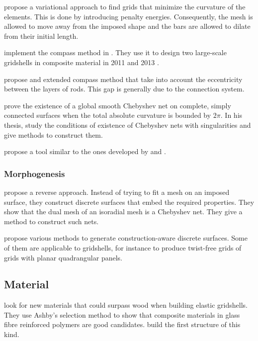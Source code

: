  propose a variational approach to find grids that minimize the curvature of the elements. This is done by introducing penalty energies. Consequently, the mesh is allowed to move away from the imposed shape and the bars are allowed to dilate from their initial length.

 implement the compass method in \grasshopper{}. They use it to design two large-scale gridshells in composite material in 2011 \cite{Baverel2012} and 2013 \Cite{DuPeloux2016}.

 propose and extended compass method that take into account the eccentricity between the layers of rods. This gap is generally due to the connection system.

 prove the existence of a global smooth Chebyshev net on complete, simply connected surfaces when the total absolute curvature is bounded by $2\pi$. In his thesis,  study the conditions of existence of Chebyshev nets with singularities and give methods to construct them.

 propose a tool similar to the ones developed by  and .

\subsubsection{Morphogenesis}

 propose a reverse approach. Instead of trying to fit a mesh on an imposed surface, they construct discrete surfaces that embed the required properties. They show that the dual mesh of an isoradial mesh is a Chebyshev net. They give a method to construct such nets.

 propose various methods to generate construction-aware discrete surfaces. Some of them are applicable to gridshells, for instance to produce twist-free grids of grids with planar quadrangular panels.

\subsection{Material}

 look for new materials that could surpass wood when building elastic gridshells. They use Ashby's selection method to show that composite materials in glass fibre reinforced polymers are good candidates.  build the first structure of this kind.

